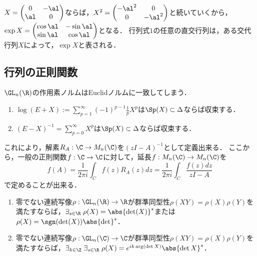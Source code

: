 \documentclass[uplatex, dvipdfmx]{jsreport}
\begin{document}
\begin{example}
    $X=\begin{pmatrix}0&-\al\\\al&0\end{pmatrix}$ならば，$X^2=\begin{pmatrix}-\al^2&0\\0&-\al^2\end{pmatrix}$と続いていくから，$\exp X=\begin{pmatrix}\cos\al&-\sin\al\\\sin\al&\cos\al\end{pmatrix}$となる．
    行列式$1$の任意の直交行列は，ある交代行列$X$によって，$\exp X$と表される．
\end{example}

\subsection{行列の正則関数}

\begin{tcolorbox}[colframe=ForestGreen, colback=ForestGreen!10!white,breakable,colbacktitle=ForestGreen!40!white,coltitle=black,fonttitle=\bfseries\sffamily,
title=]
    $\GL_n(\R)$の作用素ノルムはEuclidノルムに一致してしまう．
\end{tcolorbox}

\begin{proposition}[その他の冪級数]\mbox{}
    \begin{enumerate}
        \item $\log(E+X):=\sum_{p=1}^\infty(-1)^{p-1}\frac{1}{p}X^p$は$\Sp(X)\subset\Delta$ならば収束する．
        \item $(E-X)^{-1}=\sum^\infty_{p=0}X^p$は$\Sp(X)\subset\Delta$ならば収束する．
    \end{enumerate}
\end{proposition}
\begin{remarks}
    これにより，解素$R_A:\C\to M_n(\C)$を$(zI-A)^{-1}$として定義出来る．
    ここから，一般の正則関数$f:\C\to\C$に対して，延長$f:M_n(\C)\to M_n(\C)$を
    \[f(A)=\frac{1}{2\pi i}\int_Cf(z)R_A(z)dz=\frac{1}{2\pi i}\int_C\frac{f(z)dz}{zI-A}\]
    で定めることが出来る．
\end{remarks}

\begin{theorem}\mbox{}
    \begin{enumerate}
        \item 零でない連続写像$\rho:\GL_n(\R)\to\R$が群準同型性$\rho(XY)=\rho(X)\rho(Y)$を満たすならば，$\exists_{s\in\R}\;\rho(X)=\abs{\det(X)}^s$または$\rho(X)=\sgn(\det(X))\abs{\det}^s$．
        \item 零でない連続写像$\rho:\GL_n(\C)\to\C$が群準同型性$\rho(XY)=\rho(X)\rho(Y)$を満たすならば，$\exists_{k\in\Z}\;\exists_{s\in\R}\;\rho(X)=e^{ik\arg(\det X)}\abs{\det X}^s$．
    \end{enumerate}
\end{theorem}
\end{document}
